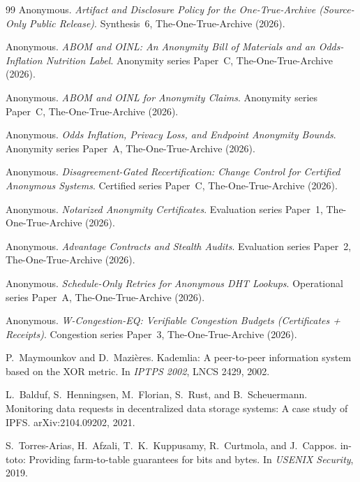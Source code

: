 \documentclass[11pt]{article}
\begin{document}
\begin{thebibliography}{99}\small
{}
Anonymous.
\newblock \emph{Artifact and Disclosure Policy for the One-True-Archive (Source-Only Public Release)}.
\newblock Synthesis~6, The-One-True-Archive (2026).

Anonymous.
\newblock \emph{ABOM and OINL: An Anonymity Bill of Materials and an Odds-Inflation Nutrition Label}.
\newblock Anonymity series Paper~C, The-One-True-Archive (2026).

Anonymous.
\newblock \emph{ABOM and OINL for Anonymity Claims}.
\newblock Anonymity series Paper~C, The-One-True-Archive (2026).

Anonymous.
\newblock \emph{Odds Inflation, Privacy Loss, and Endpoint Anonymity Bounds}.
\newblock Anonymity series Paper~A, The-One-True-Archive (2026).

Anonymous.
\newblock \emph{Disagreement-Gated Recertification: Change Control for Certified Anonymous Systems}.
\newblock Certified series Paper~C, The-One-True-Archive (2026).

Anonymous.
\newblock \emph{Notarized Anonymity Certificates}.
\newblock Evaluation series Paper~1, The-One-True-Archive (2026).

Anonymous.
\newblock \emph{Advantage Contracts and Stealth Audits}.
\newblock Evaluation series Paper~2, The-One-True-Archive (2026).

Anonymous.
\newblock \emph{Schedule-Only Retries for Anonymous DHT Lookups}.
\newblock Operational series Paper~A, The-One-True-Archive (2026).

Anonymous.
\newblock \emph{W-Congestion-EQ: Verifiable Congestion Budgets (Certificates + Receipts)}.
\newblock Congestion series Paper~3, The-One-True-Archive (2026).

P.~Maymounkov and D.~Mazi\`eres.
\newblock Kademlia: A peer-to-peer information system based on the XOR metric.
\newblock In \emph{IPTPS 2002}, LNCS 2429, 2002.

L.~Balduf, S.~Henningsen, M.~Florian, S.~Rust, and B.~Scheuermann.
\newblock Monitoring data requests in decentralized data storage systems: A case study of IPFS.
\newblock arXiv:2104.09202, 2021.

S.~Torres-Arias, H.~Afzali, T.~K.~Kuppusamy, R.~Curtmola, and J.~Cappos.
\newblock in-toto: Providing farm-to-table guarantees for bits and bytes.
\newblock In \emph{USENIX Security}, 2019.


\end{thebibliography}
\end{document}
